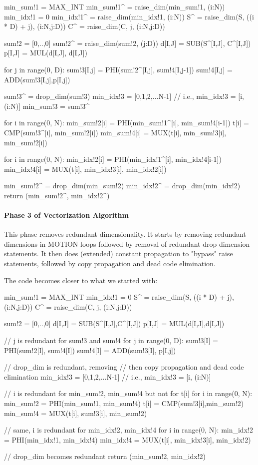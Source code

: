 {\small
\begin{pythonn}
min_sum!1 = MAX_INT
min_sum!1^ = raise_dim(min_sum!1, (i:N))
min_idx!1 = 0
min_idx!1^ = raise_dim(min_idx!1, (i:N))
S^ = raise_dim(S, ((i * D) + j), (i:N,j:D))
C^ = raise_dim(C, j, (i:N,j:D))

sum!2 = [0,..,0]
sum!2^ = raise_dim(sum!2, (j:D))
d[I,J] = SUB(S^[I,J], C^[I,J])
p[I,J] = MUL(d[I,J], d[I,J])

for j in range(0, D):
  sum!3[I,j] = PHI(sum!2^[I,j], sum!4[I,j-1])       
  sum!4[I,j] = ADD(sum!3[I,j],p[I,j])

sum!3^ = drop_dim(sum!3)     
min_idx!3 = [0,1,2,...N-1] // i.e., min_idx!3 = [i, (i:N)]
min_sum!3 = sum!3^

for i in range(0, N):
  min_sum!2[i] = PHI(min_sum!1^[i], min_sum!4[i-1]) 
  t[i] = CMP(sum!3^[i], min_sum!2[i])
  min_sum!4[i] = MUX(t[i], min_sum!3[i], min_sum!2[i])
    
for i in range(0, N):
  min_idx!2[i] = PHI(min_idx!1^[i], min_idx!4[i-1])  
  min_idx!4[i] = MUX(t[i], min_idx!3[i], min_idx!2[i])

min_sum!2^ = drop_dim(min_sum!2)
min_idx!2^ = drop_dim(min_idx!2)   
return (min_sum!2^, min_idx!2^)
\end{pythonn}
}



\paragraph{Phase 3 of Vectorization Algorithm}

This phase removes redundant dimensionality. 
It starts by removing redundant dimensions in MOTION loops followed
by removal of redundant drop dimension statements.
It then does (extended) constant propagation 
to "bypass" raise statements, followed by copy propagation
and dead code elimination.

The code becomes closer to what we started with:

{\small
\begin{pythonn}
min_sum!1 = MAX_INT
min_idx!1 = 0
S^ = raise_dim(S, ((i * D) + j), (i:N,j:D))
C^ = raise_dim(C, j, (i:N,j:D))

sum!2 = [0,..,0]
d[I,J] = SUB(S^[I,J],C^[I,J])
p[I,J] = MUL(d[I,J],d[I,J])

// j is redundant for sum!3 and sum!4
for j in range(0, D):
  sum!3[I] = PHI(sum!2[I], sum!4[I])       
  sum!4[I] = ADD(sum!3[I], p[I,j])

// drop_dim is redundant, removing
// then copy propagation and dead code elimination 
min_idx!3 = [0,1,2,...N-1] // i.e., min_idx!3 = [i, (i:N)]

// i is redundant for min_sum!2, min_sum!4 but not for t[i]
for i in range(0, N):
  min_sum!2 = PHI(min_sum!1, min_sum!4) 
  t[i] = CMP(sum!3[i],min_sum!2)
  min_sum!4 = MUX(t[i], sum!3[i], min_sum!2)

// same, i is redundant for min_idx!2, min_idx!4
for i in range(0, N):
  min_idx!2 = PHI(min_idx!1, min_idx!4)  
  min_idx!4 = MUX(t[i], min_idx!3[i], min_idx!2)

// drop_dim becomes redundant
return (min_sum!2, min_idx!2)
\end{pythonn}
}


